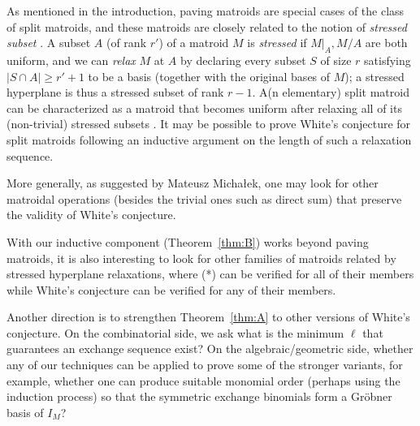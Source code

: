 \documentclass{amsart}
\begin{document}
As mentioned in the introduction, paving matroids are special cases of the class of split matroids, and these matroids are closely related to the notion of {\em stressed subset} \cite{Ferroni2024}. A subset $A$ (of rank $r'$) of a matroid $M$ is {\em stressed} if $M|_A, M/A$ are both uniform, and we can {\em relax} $M$ at $A$ by declaring every subset $S$ of size $r$ satisfying $|S\cap A|\geq r'+1$ to be a basis (together with the original bases of $M$); a stressed hyperplane is thus a stressed subset of rank $r-1$. A(n elementary) split matroid can be characterized as a matroid that becomes uniform after relaxing all of its (non-trivial) stressed subsets \cite[Theorem~4.8]{Ferroni2024}. It may be possible to prove White's conjecture for split matroids following an inductive argument on the length of such a relaxation sequence.

More generally, as suggested by Mateusz Micha\l ek, one may look for other matroidal operations (besides the trivial ones such as direct sum) that preserve the validity of White's conjecture.

With our inductive component (Theorem~\ref{thm:B}) works beyond paving matroids, it is also interesting to look for other families of matroids related by stressed hyperplane relaxations, where (*) can be verified for all of their members while White's conjecture can be verified for any of their members.

Another direction is to strengthen Theorem~\ref{thm:A} to other versions of White's conjecture. On the combinatorial side, we ask what is the minimum $\ell$ that guarantees an exchange sequence exist? On the algebraic/geometric side, whether any of our techniques can be applied to prove some of the stronger variants, for example, whether one can produce suitable monomial order (perhaps using the induction process) so that the symmetric exchange binomials form a Gr\"{o}bner basis of $I_M$?

\end{document}
